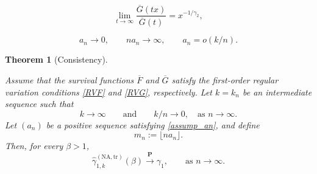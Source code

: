 \documentclass[10pt,a4paper]{amsart}
\newtheorem{theorem}{Theorem}
\begin{document}
\begin{equation}
\lim_{t\rightarrow\infty} \frac{\overline{G}(tx)}{\overline{G}(t)} =
x^{-1/\gamma_{2}}, \label{RVG}%
\end{equation}

\begin{equation}
a_{n}\rightarrow0,\qquad na_{n}\rightarrow\infty,\qquad a_{n}=o(k/n).
\label{assump_an}%
\end{equation}

\begin{theorem}
[Consistency]\label{theorem2}

Assume that the survival functions $\overline{F}$ and $\overline{G}$ satisfy
the first-order regular variation conditions \eqref{RVF} and \eqref{RVG},
respectively. Let $k=k_{n}$ be an intermediate sequence such that
\[
k\to\infty\qquad\text{and} \qquad k/n\to0, \quad\text{as } n\to\infty.
\]
Let $(a_{n})$ be a positive sequence satisfying \eqref{assump_an}, and define
\[
m_{n} := \lfloor n a_{n} \rfloor.
\]
Then, for every $\beta>1$,
\[
\widehat{\gamma}_{1,k}^{(\mathrm{NA,tr})}(\beta) \overset{\mathbf{P}%
}{\longrightarrow} \gamma_{1}, \qquad\text{as } n\to\infty.
\]

\end{theorem}
\end{document}
